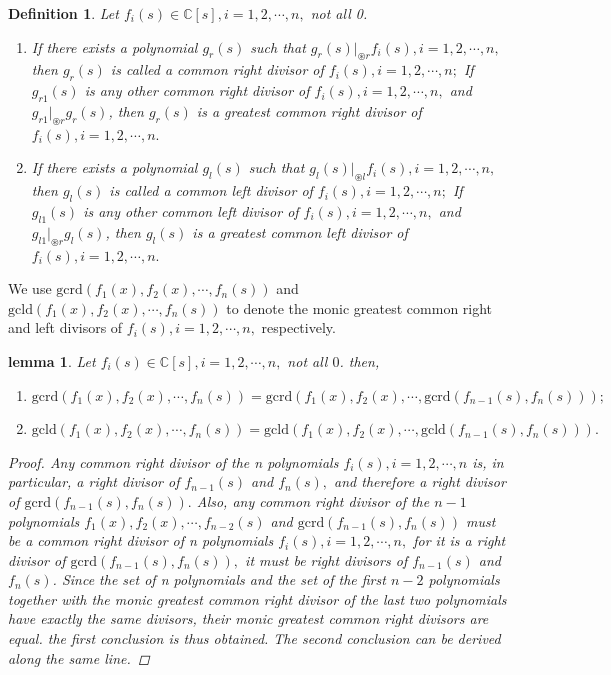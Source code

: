 \documentclass[12pt,a4paper,fleqn,twoside]{article}
\newtheorem{definition}{Definition}
\newtheorem{lemma}{lemma}
\theoremstyle{plain}
\begin{document}
	\begin{definition}
		\normalfont
		Let $f_i(s)\in \mathbb{C}[s],i=1,2,\cdots, n,$ not all 0.
		\begin{enumerate}[(1)]
			\normalfont
			\item If there exists a polynomial $g_r(s)$ such that $g_r(s)|_{\circledast r}f_i(s),i=1,2,\cdots, n,$ then $g_r(s)$ is called a common right divisor of $f_i(s),i=1,2,\cdots, n;$ If $g_{r1}(s)$ is any other common right divisor of $f_i(s),i=1,2,\cdots, n,$ and $g_{r1}|_{\circledast r}g_r(s)$, then $g_r(s)$ is a greatest common right divisor of $f_i(s),i=1,2,\cdots, n.$
			\item If there exists a polynomial $g_l(s)$ such that $g_l(s)|_{\circledast l}f_i(s),i=1,2,\cdots, n,$ then $g_l(s)$ is called a common left divisor of $f_i(s),i=1,2,\cdots, n;$ If $g_{l1}(s)$ is any other common left divisor of $f_i(s),i=1,2,\cdots, n,$ and $g_{l1}|_{\circledast r}g_l(s)$, then $g_l(s)$ is a greatest common left divisor of $f_i(s),i=1,2,\cdots, n.$
		\end{enumerate}
	\end{definition}
	We use $\mathrm{gcrd}(f_1(x),f_2(x),\cdots, f_n(s))$ and \(\mathrm{gcld}(f_1(x),f_2(x),\cdots, f_n(s))\) to denote the monic greatest common right and left divisors of $f_i(s),i=1,2,\cdots, n,$ respectively.
	\begin{lemma}
		Let $f_i(s)\in \mathbb{C}[s],i=1,2,\cdots, n,$ not all $0$. then,
		\begin{enumerate}[(1)]
			\normalfont
			\item $\mathrm{gcrd}(f_1(x),f_2(x),\cdots, f_n(s))=\mathrm{gcrd}(f_1(x),f_2(x),\cdots, \mathrm{gcrd}(f_{n-1}(s),f_n(s)));$
			\item $\mathrm{gcld}(f_1(x),f_2(x),\cdots, f_n(s))=\mathrm{gcld}(f_1(x),f_2(x),\cdots, \mathrm{gcld}(f_{n-1}(s),f_n(s))).$
		\end{enumerate}
		\begin{proof}
			Any common right divisor of the n polynomials $f_i(s),i=1,2,\cdots, n$ is, in particular, a right divisor of $f_{n-1}(s)$ and $f_n(s),$ and therefore a right divisor of $\mathrm{gcrd}(f_{n-1}(s),f_n(s)).$ Also, any common right divisor of the $n-1$ polynomials $f_1(x),f_2(x),\cdots, f_{n-2}(s)$ and $\mathrm{gcrd}(f_{n-1}(s),f_n(s))$ must be a common right divisor of n polynomials $f_i(s),i=1,2,\cdots, n,$ for it is a right divisor of $\mathrm{gcrd}(f_{n-1}(s),f_n(s)),$ it must be right divisors of $f_{n-1}(s)$ and $f_n(s)$. Since the set of n polynomials and the set of the first $n-2$ polynomials together with the monic greatest common right divisor of the last two polynomials have exactly the same divisors, their monic greatest common right divisors are equal. the first conclusion is thus obtained. The second conclusion can be derived along the same line. 
		\end{proof}
	\end{lemma}
\end{document}
